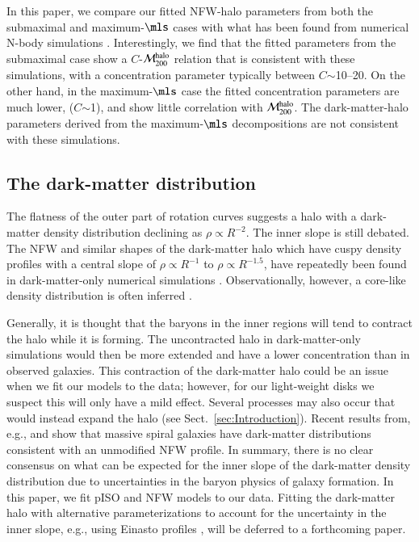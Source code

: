 \documentclass[traditabstract]{aa} %
\begin{document}
In this paper, we compare our fitted NFW-halo parameters from both the submaximal and 
maximum-$\mls$ cases with what has been found from numerical N-body simulations 
\citep{bullock2001}. Interestingly, we find that the fitted parameters from the submaximal
case show a $C$-$\mathcal{M}_{200}^{\rm halo}$ relation that is consistent with these
simulations, with a concentration parameter typically between $C$$\sim$10--20. On the 
other hand, in the maximum-$\mls$ case the fitted concentration parameters are
much lower, ($C$$\sim$1), and show little correlation with $\mathcal{M}_{200}^{\rm halo}$.
The dark-matter-halo parameters derived from the maximum-$\mls$ decompositions are not
consistent with these simulations.


\subsection{The dark-matter distribution}
\label{sec:ISOvsNFW}
The flatness of the outer part of rotation curves suggests a halo with a dark-matter 
density distribution declining as $\rho$$\propto$$R^{-2}$. The inner slope is still
debated. The NFW and similar shapes of the dark-matter halo which have cuspy density
profiles with a central slope of $\rho$$\propto$$R^{-1}$ to $\rho$$\propto$$R^{-1.5}$,
have repeatedly been found in dark-matter-only numerical simulations 
\citep[e.g.,][]{NFW1996, NFW1997, moore1999,klypin2001,diemand2005}. Observationally,
however, a core-like density distribution is often inferred \citep{deBlok2001, 
swaters2003a, swaters2003b, KuziodeNaray2008, KuziodeNaray2009, deBlok2010, oh2011}.

Generally, it is thought \citep[e.g.,][]{blumenthal1986, gnedin2004} that the baryons in
the inner regions will tend to contract the halo while it is forming. The uncontracted 
halo in dark-matter-only simulations would then be more extended and have a lower
concentration than in observed galaxies. This contraction of the dark-matter halo could be
an issue when we fit our models to the data; however, for our light-weight disks we 
suspect this will only have a mild effect.
%
Several processes may also occur that would instead expand the halo (see
Sect.~\ref{sec:Introduction}). Recent results from, e.g., \cite{barnabe2012} and 
\cite{dutton2013} show that massive spiral galaxies have dark-matter distributions
consistent with an unmodified NFW profile.
%
In summary, there is no clear consensus on what can be expected for the inner slope of
the dark-matter density distribution due to uncertainties in the baryon physics of galaxy
formation. In this paper, we fit pISO and NFW models to our data. Fitting the
dark-matter halo with alternative parameterizations to account for the uncertainty in the
inner slope, e.g., using Einasto profiles \citep{einasto1979, chemin2011}, will be
deferred to a forthcoming paper.
\end{document}
